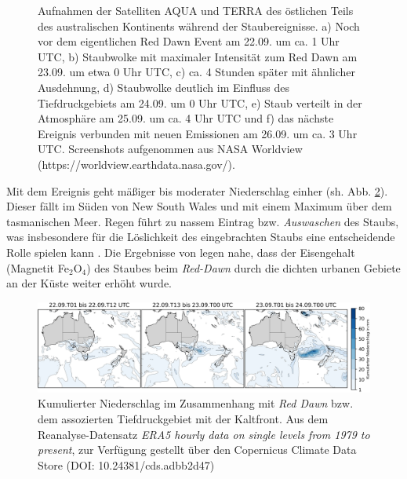 \documentclass[12pt,a4paper,onecolumn]{scrartcl}
\begin{document}
\begin{figure}
\begin{minipage}[c]{0.32\textwidth}
	\end{minipage}\hfill
\caption{Aufnahmen der Satelliten AQUA und TERRA des östlichen Teils des australischen Kontinents während der Staubereignisse. a) Noch vor dem eigentlichen Red Dawn Event am 22.09. um ca. 1 Uhr UTC, b) Staubwolke mit maximaler Intensität zum Red Dawn am 23.09. um etwa 0 Uhr UTC, c) ca. 4 Stunden später mit ähnlicher Ausdehnung, d) Staubwolke deutlich im Einfluss des Tiefdruckgebiets am 24.09. um 0 Uhr UTC, e) Staub verteilt in der Atmosphäre am 25.09. um ca. 4 Uhr UTC und f) das nächste Ereignis verbunden mit neuen Emissionen am 26.09. um ca. 3 Uhr UTC.  Screenshots aufgenommen aus NASA Worldview (https://worldview.earthdata.nasa.gov/).} \label{fig:satellite}
\end{figure}
Mit dem Ereignis geht mäßiger bis moderater Niederschlag einher (sh. Abb.  \ref{fig:rain}). Dieser fällt im Süden von New South Wales und mit einem Maximum über dem tasmanischen Meer. Regen führt zu nassem Eintrag bzw. \textit{Auswaschen} des Staubs, was insbesondere für die Löslichkeit des eingebrachten Staubs eine entscheidende Rolle spielen kann \citep{Shao.2011}. Die Ergebnisse von \citet{Reynolds.2014} legen nahe, dass der Eisengehalt (Magnetit Fe$_2$O$_4$) des Staubes beim \textit{Red-Dawn} durch die dichten urbanen Gebiete an der Küste weiter erhöht wurde.
\begin{figure}
\includegraphics[width=\textwidth]{bilder/reddawn/rain.png}
\caption{Kumulierter Niederschlag im Zusammenhang mit \textit{Red Dawn} bzw. dem assozierten Tiefdruckgebiet mit der Kaltfront. Aus dem Reanalyse-Datensatz \textit{ERA5 hourly data on single levels from 1979 to present}, zur Verfügung gestellt über den Copernicus Climate Data Store (DOI: 10.24381/cds.adbb2d47) } \label{fig:rain}
\end{figure}
\end{document}
